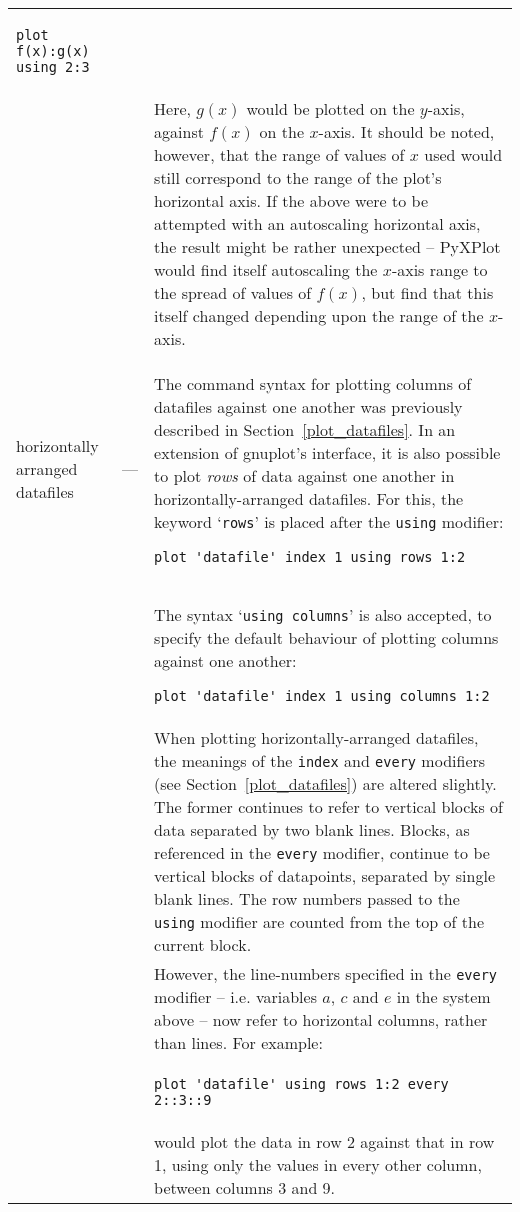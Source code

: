 \documentclass[a4paper,onecolumn,11pt]{book}
\begin{document}
\begin{longtable}{p{3cm}lp{9cm}}
\begin{verbatim}
plot f(x):g(x) using 2:3
\end{verbatim}
\\ & &
Here, $g(x)$ would be plotted on the $y$-axis, against $f(x)$ on the $x$-axis.
It should be noted, however, that the range of values of $x$ used would still
correspond to the range of the plot's horizontal axis. If the above were to be
attempted with an autoscaling horizontal axis, the result might be rather
unexpected -- PyXPlot would find itself autoscaling the $x$-axis range to the
spread of values of $f(x)$, but find that this itself changed depending upon
the range of the $x$-axis. \\

horizontally arranged datafiles\index{horizontal
datafiles}\index{datafiles!horizontal}\index{using rows modifier@\texttt{using
rows} modifier}\index{using columns modifier@\texttt{using columns}
modifier}\label{horizontal_datafiles} & --- & The command syntax for plotting
columns of datafiles against one another was previously described in
Section~\ref{plot_datafiles}.  In an extension of gnuplot's interface, it is
also possible to plot \textit{rows} of data against one another in
horizontally-arranged datafiles.  For this, the keyword `\texttt{rows}' is
placed after the \texttt{using} modifier:\index{rows keyword@\texttt{rows} keyword}

\begin{verbatim}
plot 'datafile' index 1 using rows 1:2
\end{verbatim}
\\ & &
The syntax `\texttt{using columns}' is also accepted, to specify the default
behaviour of plotting columns against one another:\index{columns keyword@\texttt{columns} keyword}

\begin{verbatim}
plot 'datafile' index 1 using columns 1:2
\end{verbatim}
\\ & &
When plotting horizontally-arranged datafiles, the meanings of the
\texttt{index} and \texttt{every} modifiers (see Section~\ref{plot_datafiles})
are altered slightly. The former continues to refer to vertical blocks of data
separated by two blank lines.  Blocks, as referenced in the \texttt{every}
modifier, continue to be vertical blocks of datapoints, separated by single
blank lines. The row numbers passed to the \texttt{using} modifier are counted
from the top of the current block.
\\ & &
However, the line-numbers specified in the \texttt{every} modifier -- i.e.
variables $a$, $c$ and $e$ in the system above -- now refer to horizontal
columns, rather than lines. For example:
\\ & &
\begin{verbatim}
plot 'datafile' using rows 1:2 every 2::3::9
\end{verbatim}
\\ & &
\noindent would plot the data in row 2 against that in row 1, using only the
values in every other column, between columns 3 and 9.
\\


\end{longtable}
\end{document}
